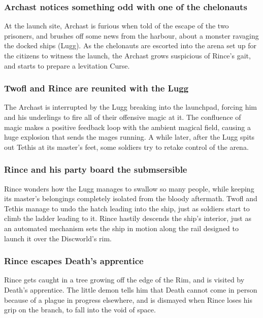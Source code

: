 \subsubsection{\Gls{Archast} notices something odd with one of the chelonauts}
At the launch site, \Gls{Archast} is furious when told of the escape of the two prisoners, and
brushes off some news from the harbour, about a monster ravaging the docked ships (\Gls{Lugg}).
As the chelonauts are escorted into the arena set up for the citizens to witness the launch,
the \Gls{Archast} grows suspicious of \Gls{Rince}'s gait, and starts to prepare a levitation
Curse.

\subsubsection{\Gls{Twofl} and \Gls{Rince} are reunited with the \Gls{Lugg}}
The \Gls{Archast} is interrupted by the \Gls{Lugg} breaking into the launchpad, forcing him and his
underlings to fire all of their offensive magic at it. The confluence of magic makes a positive
feedback loop with the ambient magical field, causing a huge explosion that sends the mages
running. A while later, after the \Gls{Lugg} spits out \Gls{Tethis} at its master's feet, some
soldiers try to retake control of the arena.

\subsubsection{\Gls{Rince} and his party board the submsersible}
\Gls{Rince} wonders how the \Gls{Lugg} manages to swallow so many people, while keeping its master's
belongings completely isolated from the bloody aftermath. \Gls{Twofl} and \Gls{Tethis} manage to
undo the hatch leading into the ship, just as soldiers start to climb the ladder leading to it.
\Gls{Rince} hastily descends the ship's interior, just as an automated mechanism sets the ship in
motion along the rail designed to launch it over the Discworld's rim.

\subsubsection{\Gls{Rince} escapes \Gls{Death}'s apprentice}
\Gls{Rince} gets caught in a tree growing off the edge of the Rim, and is visited by \Gls{Death}'s
apprentice. The little demon tells him that \Gls{Death} cannot come in person because of a plague
in progress elsewhere, and is dismayed when \Gls{Rince} loses his grip on the branch, to fall into
the void of space.